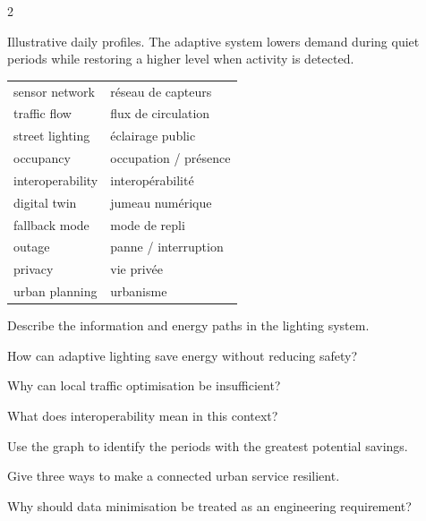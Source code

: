 \begin{multicols}{2}
\begin{tcolorbox}[title=\sffamily\bfseries Lighting power profile,colback=white,colframe=ECGreen]
\begin{center}
\end{center}
\footnotesize Illustrative daily profiles. The adaptive system lowers demand during quiet periods
while restoring a higher level when activity is detected.
\end{tcolorbox}

\begin{vocabulary}
\begin{tabularx}{\linewidth}{@{}lX@{}}
sensor network & réseau de capteurs\\
traffic flow & flux de circulation\\
street lighting & éclairage public\\
occupancy & occupation / présence\\
interoperability & interopérabilité\\
digital twin & jumeau numérique\\
fallback mode & mode de repli\\
outage & panne / interruption\\
privacy & vie privée\\
urban planning & urbanisme
\end{tabularx}
\end{vocabulary}

\begin{questions}
\item Describe the information and energy paths in the lighting system.
\item How can adaptive lighting save energy without reducing safety?
\item Why can local traffic optimisation be insufficient?
\item What does interoperability mean in this context?
\item Use the graph to identify the periods with the greatest potential savings.
\item Give three ways to make a connected urban service resilient.
\item Why should data minimisation be treated as an engineering requirement?
\end{questions}


\end{multicols}

